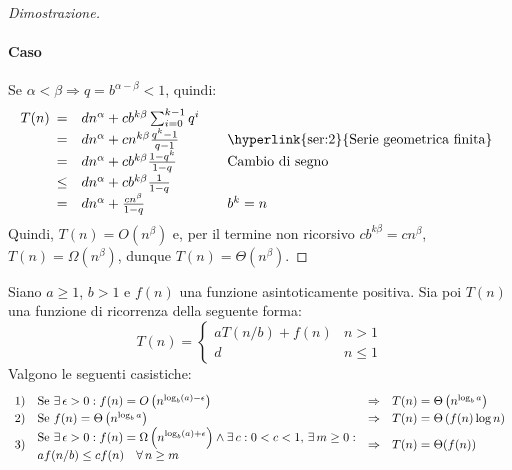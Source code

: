 \begin{proof}[Dimostrazione]
    \paragraph{Caso \bm{$\alpha<\beta$}}
    Se $\alpha<\beta\Rightarrow q=b^{\alpha-\beta}<1$, quindi:
    \[T(n)\begin{array}[t]{cll}
        = & dn^\alpha+cb^{k\beta}\sum_{i=0}^{k-1}q^i\\
        = & dn^\alpha+cn^{k\beta}\frac{q^k-1}{q-1} & \quad\text{\hyperlink{ser:2}{Serie geometrica finita}}\\
        = & dn^\alpha+cb^{k\beta}\frac{1-q^k}{1-q} & \quad\text{Cambio di segno}\\
        \leq & dn^\alpha+cb^{k\beta}\frac{1}{1-q}\\
        = & dn^\alpha+\frac{cn^\beta}{1-q} & \quad b^k=n
    \end{array}\]
    Quindi, $T(n)=O(n^\beta)$ e, per il termine non ricorsivo $cb^{k\beta}=cn^\beta$,
    $T(n)=\Omega(n^\beta)$, dunque $T(n)=\Theta(n^\beta)$.
\end{proof}

\begin{definition}
    Siano $a\geq1$, $b>1$ e $f(n)$ una funzione asintoticamente positiva. Sia poi
    $T(n)$ una funzione di ricorrenza della seguente forma:
    \[T(n)=\begin{cases}
        aT(n/b)+f(n) & n>1\\
        d & n\leq1
    \end{cases}\]
    Valgono le seguenti casistiche:
    \[\renewcommand{\arraystretch}{1.2}\begin{array}[b]{llcl}
        1) & \text{Se }\exists\,\epsilon>0:f(n)=O\left(n^{\log_b(a)-\epsilon}\right) &
        \Rightarrow & T(n)=\Theta\left(n^{\log_ba}\right)\\
        2) & \text{Se }f(n)=\Theta\left(n^{\log_ba}\right) & \Rightarrow & T(n)=\Theta\left(
        f(n)\log n\right)\\
        3) & \begin{aligned}
            &\text{Se }\exists\,\epsilon>0:f(n)=\Omega\left(n^{\log_b(a)+\epsilon}\right)
            \wedge\exists\,c:0<c<1,\,\exists\,m\geq0: \\[-0.3em]
            & af(n/b)\leq cf(n)\quad\forall\,n\geq m
        \end{aligned}
         & \Rightarrow & T(n)=\Theta(f(n))
    \end{array}\]
\end{definition}

